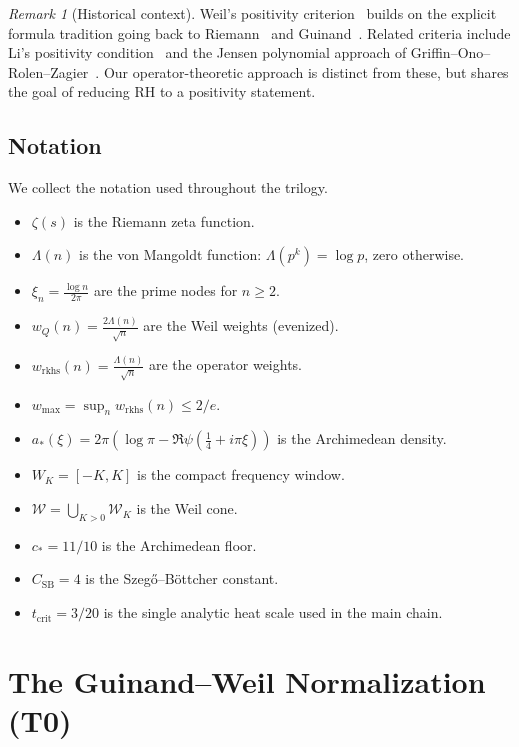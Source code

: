 \documentclass[11pt,a4paper]{article}
\theoremstyle{definition}
\theoremstyle{remark}
\newtheorem{remark}[theorem]{Remark}
\begin{document}
\begin{remark}[Historical context]\label{rem:history}
Weil's positivity criterion~\cite{Weil1952,Weil1972} builds on the explicit formula tradition going back to Riemann~\cite{Riemann1859} and Guinand~\cite{Guinand1948}. Related criteria include Li's positivity condition~\cite{Li1997} and the Jensen polynomial approach of Griffin--Ono--Rolen--Zagier~\cite{GriffinOnoRolenZagier2019}. Our operator-theoretic approach is distinct from these, but shares the goal of reducing RH to a positivity statement.
\end{remark}

\subsection{Notation}\label{sec:notation}

We collect the notation used throughout the trilogy.

\begin{itemize}
\item $\zeta(s)$ is the Riemann zeta function.
\item $\Lambda(n)$ is the von Mangoldt function: $\Lambda(p^k) = \log p$, zero otherwise.
\item $\xi_n = \frac{\log n}{2\pi}$ are the prime nodes for $n \geq 2$.
\item $w_Q(n) = \frac{2\Lambda(n)}{\sqrt{n}}$ are the Weil weights (evenized).
\item $w_{\mathrm{rkhs}}(n) = \frac{\Lambda(n)}{\sqrt{n}}$ are the operator weights.
\item $w_{\max} = \sup_n w_{\mathrm{rkhs}}(n) \leq 2/e$.
\item $a_*(\xi) = 2\pi(\log\pi - \Re\psi(\tfrac{1}{4} + i\pi\xi))$ is the Archimedean density.
\item $W_K = [-K, K]$ is the compact frequency window.
\item $\mathcal{W} = \bigcup_{K > 0} \mathcal{W}_K$ is the Weil cone.
\item $c_* = 11/10$ is the Archimedean floor.
\item $C_{\mathrm{SB}} = 4$ is the Szeg\H{o}--B\"ottcher constant.
\item $t_{\mathrm{crit}} = 3/20$ is the single analytic heat scale used in the main chain.
\end{itemize}

\section{The Guinand--Weil Normalization (T0)}
\label{sec:T0}
\end{document}
